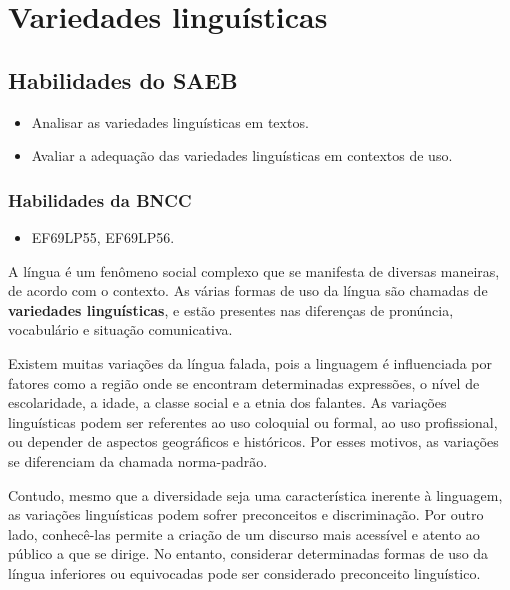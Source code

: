 \chapter{Variedades linguísticas}

\section{Habilidades do SAEB}

\begin{itemize}

  \item Analisar as variedades linguísticas em textos.

  \item Avaliar a adequação das variedades linguísticas em contextos de uso.

\end{itemize}

\subsection{Habilidades da BNCC}

\begin{itemize}

  \item EF69LP55, EF69LP56.

\end{itemize}


A língua é um fenômeno social complexo que se manifesta de diversas
maneiras, de acordo com o contexto. As várias
formas de uso da língua são chamadas de \textbf{variedades linguísticas}, e estão
presentes nas diferenças de pronúncia, vocabulário e situação
comunicativa.

Existem muitas variações da língua falada, pois a linguagem é
influenciada por fatores como a região onde se encontram determinadas
expressões, o nível de escolaridade, a idade, a classe social e a etnia
dos falantes. As variações linguísticas podem ser referentes
ao uso coloquial ou formal, ao uso profissional, ou depender de aspectos
geográficos e históricos. Por esses motivos, as variações
se diferenciam da chamada norma-padrão.

Contudo, mesmo que a diversidade seja uma característica
inerente à linguagem, as variações linguísticas podem sofrer preconceitos
e discriminação. Por outro lado, conhecê-las permite a criação de um
discurso mais acessível e atento ao público a que se dirige. No entanto,
considerar determinadas formas de uso da língua inferiores ou
equivocadas pode ser considerado preconceito linguístico.

